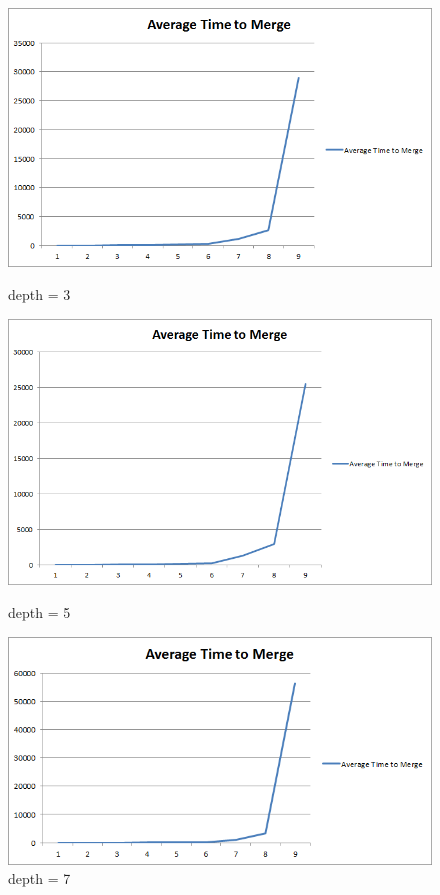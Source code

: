 \begin{figure}[ht]
\begin{minipage}[b]{0.28\linewidth}
\centering
\includegraphics[width=\textwidth]{media/chapter5/perf/mergedepthtest_3.png}
\caption{depth = 3}
\label{fig:pic1}
\end{minipage}
\hspace{0.5cm}
\begin{minipage}[b]{0.28\linewidth}
\centering
\includegraphics[width=\textwidth]{media/chapter5/perf/mergedepthtest_5.png}
\caption{depth = 5}
\label{fig:pic2}
\end{minipage}
\hspace{0.5cm}
\begin{minipage}[b]{0.32\linewidth}
\centering
\includegraphics[width=\textwidth]{media/chapter5/perf/mergedepthtest_7.png}
\caption{depth = 7}
\label{fig:pic3}
\end{minipage}

\end{figure}

